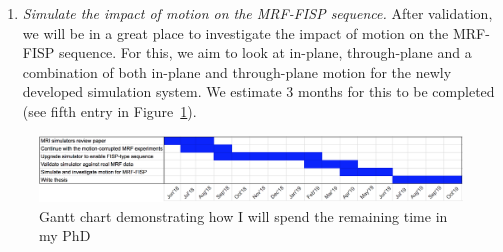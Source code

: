 \begin{enumerate}
	\item \textit{Simulate the impact of motion on the MRF-FISP sequence.}
	After validation, we will be in a great place to investigate the impact of motion on the MRF-FISP sequence.
	For this, we aim to look at in-plane, through-plane and a combination of both in-plane and through-plane motion for the newly developed simulation system.
	We estimate 3 months for this to be completed (see fifth entry in Figure~\ref{fig:ganttChart}).
	
\end{enumerate}

\begin{figure}[ht]
    \centering
    \includegraphics[width=1\textwidth, keepaspectratio]{images/mri/ganttChart}
    \caption{Gantt chart demonstrating how I will spend the remaining time in my PhD}
    \label{fig:ganttChart}
\end{figure}
